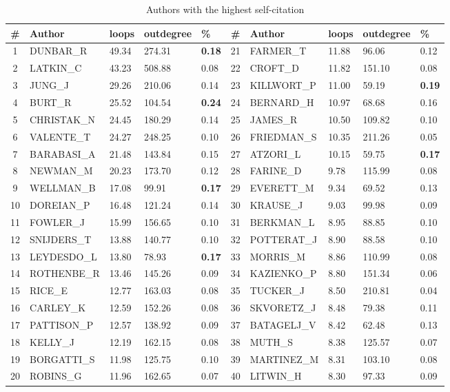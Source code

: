 \documentclass[11pt]{article} %
\begin{document}
\begin{table}
\caption{Authors with the highest self-citation} \label{authcite}\medskip
\renewcommand{\arraystretch}{0.99}
\small
\begin{center}
\begin{tabular}{c|l|l|l|l|c|l|l|l|l|} 
\# &	Author & loops &	outdegree & \% &  \# &	Author&  loops &	outdegree & \% \\ \hline 
1	&DUNBAR\_R	&49.34	&274.31	&\textbf{0.18}	      & 21	&FARMER\_T	&11.88	&96.06	&0.12		   \\
2	&LATKIN\_C	&43.23	&508.88	&0.08	      & 22	&CROFT\_D		&11.82	&151.10	&0.08	   \\
3	&JUNG\_J		&29.26	&210.06	&0.14	      & 23	&KILLWORT\_P	&11.00	&59.19	&\textbf{0.19}		   \\
4	&BURT\_R		&25.52	&104.54	&\textbf{0.24}	      & 24	&BERNARD\_H	&10.97	&68.68	&0.16		   \\
5	&CHRISTAK\_N	&24.45	&180.29	&0.14	      & 25	&JAMES\_R		&10.50	&109.82	&0.10	   \\
6	&VALENTE\_T	&24.27	&248.25	&0.10	      & 26	&FRIEDMAN\_S	&10.35	&211.26	&0.05		   \\
7	&BARABASI\_A	&21.48	&143.84	&0.15	      & 27	&ATZORI\_L	&10.15	&59.75	&\textbf{0.17}		   \\
8	&NEWMAN\_M	&20.23	&173.70	&0.12	      & 28	&FARINE\_D	&9.78	&115.99	&0.08		   \\
9	&WELLMAN\_B	&17.08	&99.91	&\textbf{0.17}	      & 29	&EVERETT\_M	&9.34	&69.52	&0.13		   \\
10	&DOREIAN\_P	&16.48	&121.24	&0.14	      & 30	&KRAUSE\_J	&9.03	&99.98	&0.09		   \\
11	&FOWLER\_J	&15.99	&156.65	&0.10	      & 31	&BERKMAN\_L	&8.95	&88.85	&0.10		   \\
12	&SNIJDERS\_T	&13.88	&140.77	&0.10	      & 32	&POTTERAT\_J	&8.90	&88.58	&0.10		   \\
13	&LEYDESDO\_L	&13.80	&78.93	&\textbf{0.17}	      & 33	&MORRIS\_M	&8.86	&110.99	&0.08		   \\
14	&ROTHENBE\_R	&13.46	&145.26	&0.09	      & 34	&KAZIENKO\_P	&8.80	&151.34	&0.06		   \\
15	&RICE\_E		&12.77	&163.03	&0.08	      & 35	&TUCKER\_J	&8.50	&210.81	&0.04		   \\
16	&CARLEY\_K	&12.59	&152.26	&0.08	      & 36	&SKVORETZ\_J	&8.48	&79.38	&0.11		   \\
17	&PATTISON\_P	&12.57	&138.92	&0.09	      & 37	&BATAGELJ\_V	&8.42	&62.48	&0.13		   \\
18	&KELLY\_J		&12.19	&162.15	&0.08	      & 38	&MUTH\_S		&8.38	&125.57	&0.07	   \\
19	&BORGATTI\_S	&11.98	&125.75	&0.10	      & 39	&MARTINEZ\_M	&8.31	&103.10	&0.08		   \\
20	&ROBINS\_G	&11.96	&162.65	&0.07	      & 40	&LITWIN\_H	&8.30	&97.33	&0.09		   \\ \hline 
\end{tabular} 
\end{center}
\end{table}  
\end{document}
